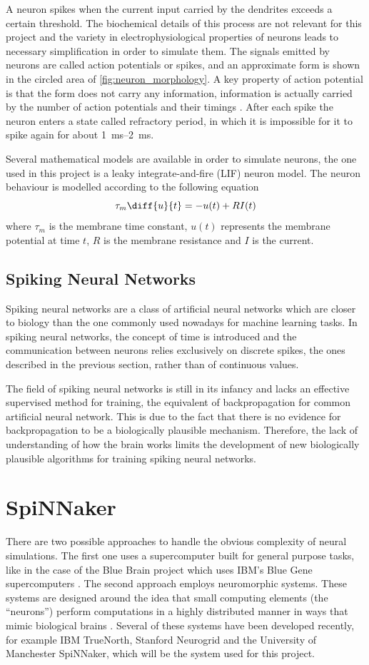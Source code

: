 A neuron spikes when the current input carried by the dendrites exceeds a certain threshold. The biochemical details of this process are not relevant for this project and the variety in electrophysiological properties of neurons \cite{Llinas:2008} leads to necessary simplification in order to simulate them. The signals emitted by neurons are called action potentials or spikes, and an approximate form is shown in the circled area of  \cref{fig:neuron_morphology}. A key property of action potential is that the form does not carry any information, information is actually carried by the number of action potentials and their timings \cite{Gerstner:2014}. After each spike the neuron enters a state called refractory period, in which it is impossible for it to spike again for about \SIrange{1}{2}{\milli\second}.

Several mathematical models are available in order to simulate neurons, the one used in this project is a leaky integrate-and-fire (LIF) neuron model. The neuron behaviour is modelled according to the following equation
\[
\tau_m \diff{u}{t} = -u(t)+RI(t)
\]
where $\tau_m$ is the membrane time constant, $u(t)$ represents the membrane potential at time $t$, $R$ is the membrane resistance and $I$ is the current. 

\subsection{Spiking Neural Networks}
Spiking neural networks are a class of artificial neural networks which are closer to biology than the one commonly used nowadays for machine learning tasks. In spiking neural networks, the concept of time is introduced and the communication between neurons relies exclusively on discrete spikes, the ones described in the previous section, rather than of continuous values. 

The field of spiking neural networks is still in its infancy and lacks an effective supervised method for training, the equivalent of backpropagation for common artificial neural network. This is due to the fact that there is no evidence for backpropagation to be a biologically plausible mechanism. Therefore, the lack of understanding of how the brain works limits the development of new biologically plausible algorithms for training spiking neural networks. 


\section{SpiNNaker}
There are two possible approaches to handle the obvious complexity of neural simulations. The first one uses a supercomputer built for general purpose tasks, like in the case of the Blue Brain project which uses IBM's Blue Gene supercomputers \cite{Markram2006}. The second approach employs neuromorphic systems. These systems are designed around the idea that small computing elements (the ``neurons'') perform computations in a highly distributed manner in ways that mimic biological brains \cite{Furber2016}. Several of these systems have been developed recently, for example IBM TrueNorth, Stanford Neurogrid and the University of Manchester SpiNNaker, which will be the system used for this project.

